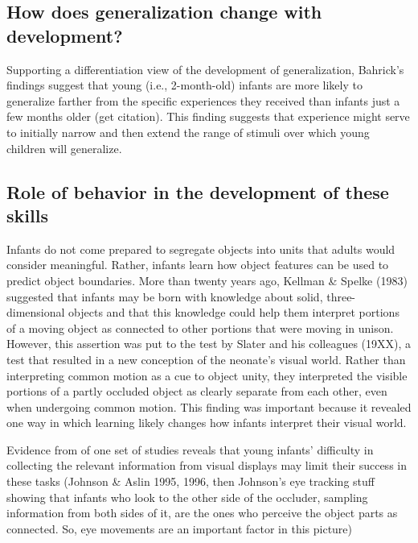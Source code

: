 \subsection{How does generalization change with development?}

Supporting a differentiation view of the development of
generalization, Bahrick's findings suggest that young (i.e.,
2-month-old) infants are more likely to generalize farther from the
specific experiences they received than infants just a few months
older (get citation).  This finding suggests that experience might
serve to initially narrow and then extend the range of stimuli over
which young children will generalize.

\subsection{Role of behavior in the development of these skills}

Infants do not come prepared to segregate objects into units that
adults would consider meaningful.  Rather, infants learn how object
features can be used to predict object boundaries.  More than twenty
years ago, Kellman \& Spelke (1983) suggested that infants may be born
with knowledge about solid, three-dimensional objects and that this
knowledge could help them interpret portions of a moving object as
connected to other portions that were moving in unison.  However, this
assertion was put to the test by Slater and his colleagues (19XX), a
test that resulted in a new conception of the neonate's visual
world.  Rather than interpreting common motion as a cue to object
unity, they interpreted the visible portions of a partly occluded
object as clearly separate from each other, even when undergoing
common motion.  This finding was important because it revealed one way
in which learning likely changes how infants interpret their visual
world.

Evidence from of one set of studies reveals that young
infants' difficulty in collecting the relevant information
from visual displays may limit their success in these tasks (Johnson \&
Aslin 1995, 1996, then Johnson's eye tracking stuff showing
that infants who look to the other side of the occluder, sampling
information from both sides of it, are the ones who perceive the
object parts as connected.  So, eye movements are an important factor
in this picture)

